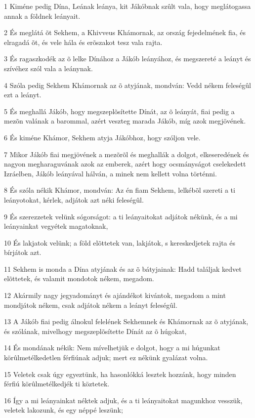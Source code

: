\par 1 Kiméne pedig Dína, Leának leánya, kit Jákóbnak szûlt vala, hogy meglátogassa annak a földnek leányait.
\par 2 És meglátá õt Sekhem, a Khivveus Khámornak, az ország fejedelmének fia, és elragadá õt, és vele hála és erõszakot tesz vala rajta.
\par 3 És ragaszkodék az õ lelke Dínához a Jákób leányához, és megszereté a leányt és szívéhez szól vala a leánynak.
\par 4 Szóla pedig Sekhem Khámornak az õ atyjának, mondván: Vedd nékem feleségûl ezt a leányt.
\par 5 És meghallá Jákób, hogy megszeplõsítette Dínát, az õ leányát, fiai pedig a mezõn valának a barommal, azért veszteg marada Jákób, míg azok megjövének.
\par 6 És kiméne Khámor, Sekhem atyja Jákóbhoz, hogy szóljon vele.
\par 7 Mikor Jákób fiai megjövének a mezõrõl és meghallák a dolgot, elkeseredének és nagyon megharaguvának azok az emberek, azért hogy ocsmányságot cselekedett Izráelben, Jákób leányával hálván, a minek nem kellett volna történni.
\par 8 És szóla nékik Khámor, mondván: Az én fiam Sekhem, lelkébõl szereti a ti leányotokat, kérlek, adjátok azt néki feleségûl.
\par 9 És szerezzetek velünk sógorságot: a ti leányaitokat adjátok nékünk, és a mi leányainkat vegyétek magatoknak,
\par 10 És lakjatok velünk; a föld elõttetek van, lakjátok, s kereskedjetek rajta és bírjátok azt.
\par 11 Sekhem is monda a Dína atyjának és az õ bátyjainak: Hadd találjak kedvet elõttetek, és valamit mondotok nékem, megadom.
\par 12 Akármily nagy jegyadományt és ajándékot kivántok, megadom a mint mondjátok nékem, csak adjátok nékem a leányt feleségûl.
\par 13 A Jákób fiai pedig álnokul felelének Sekhemnek és Khámornak az õ atyjának, és szólának, mivelhogy megszeplõsítette Dínát az õ húgokat,
\par 14 És mondának nékik: Nem mívelhetjük e dolgot, hogy a mi húgunkat körûlmetélkedetlen férfiúnak adjuk; mert ez nékünk gyalázat volna.
\par 15 Veletek csak úgy egyeztünk, ha hasonlókká lesztek hozzánk, hogy minden férfiú körûlmetélkedjék ti köztetek.
\par 16 Így a mi leányainkat néktek adjuk, és a ti leányaitokat magunkhoz vesszük, veletek lakozunk, és egy néppé leszünk;

